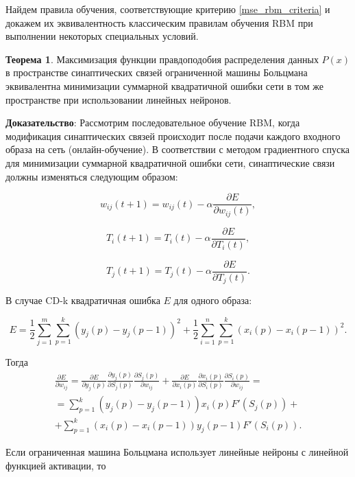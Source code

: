 Найдем правила обучения, соответствующие критерию \ref{mse_rbm_criteria} и докажем их эквивалентность классическим правилам обучения RBM при выполнении некоторых специальных условий.

\textbf{Теорема 1}. Максимизация функции правдоподобия распределения данных $P(x)$ в пространстве синаптических связей ограниченной машины Больцмана эквивалентна минимизации суммарной квадратичной ошибки сети в том же пространстве при использовании линейных нейронов.

\textbf{Доказательство}: Рассмотрим последовательное обучение RBM, когда модификация синаптических связей происходит после подачи каждого входного образа на сеть (онлайн-обучение). В соответствии с методом градиентного спуска для минимизации суммарной квадратичной ошибки сети, синаптические связи должны изменяться следующим образом:	

\begin{equation}
w_{ij}(t+1)=w_{ij}(t)-\alpha\frac{\partial E}{\partial w_{ij}(t)},
\end{equation}		

\begin{equation}
T_{i}(t+1)=T_{i}(t)-\alpha\frac{\partial E}{\partial T_{i}(t)},
\end{equation}		

\begin{equation}
T_{j}(t+1)=T_{j}(t)-\alpha\frac{\partial E}{\partial T_{j}(t)}.
\end{equation}

В случае CD-k квадратичная ошибка $E$ для одного образа:

\begin{equation*}
E=\frac{1}{2}\sum_{j=1}^m\sum_{p=1}^k (y_j(p)-y_j(p-1))^2+\frac{1}{2}\sum_{i=1}^n\sum_{p=1}^k (x_i(p)-x_i(p-1))^2.
\end{equation*}

Тогда
\begin{multline*}
    \frac{\partial E}{\partial w_{ij}}=\frac{\partial E}{\partial y_j(p)}\frac{\partial y_j(p)}{\partial S_j(p)}\frac{\partial S_j(p)}{\partial w_{ij}}+\frac{\partial E}{\partial x_i(p)}\frac{\partial x_i(p)}{\partial S_i(p)}\frac{\partial S_i(p)}{\partial w_{ij}}=\\=\sum_{p=1}^k (y_j(p)-y_j(p-1))x_i(p)F'(S_j(p))+\\+\sum_{p=1}^k (x_i(p)-x_i(p-1))y_j(p-1)F'(S_i(p)).
\end{multline*}

Если ограниченная машина Больцмана использует линейные нейроны с линейной функцией активации, то

